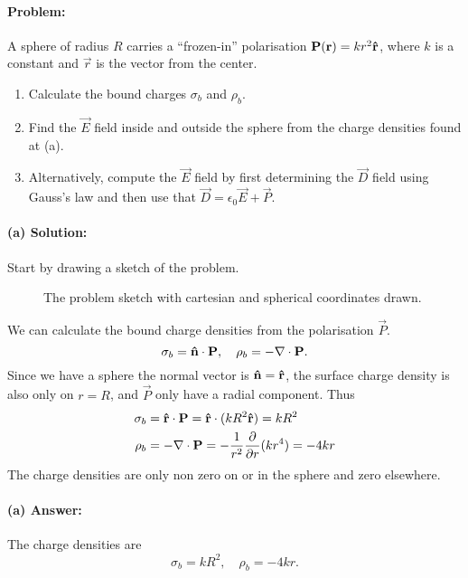 \paragraph{Problem:} A sphere of radius $R$ carries a ``frozen-in'' polarisation $\mathbf{P}(\mathbf{r}) = kr^2 \mathbf{\hat{r}}$, where $k$ is a constant
and $\vec{r}$ is the vector from the center.
\begin{enumerate}[label=(\alph*)]
    \item Calculate the bound charges $\sigma_b$ and $\rho_b$.
    \item Find the $\vec{E}$ field inside and outside the sphere from the charge densities found at (a).
    \item Alternatively, compute the $\vec{E}$ field by first determining the $\vec{D}$ field using Gauss's law and then use that $\vec{D} = \epsilon_0 \vec{E} + \vec{P}$.
\end{enumerate}

\paragraph{(a) Solution:}
Start by drawing a sketch of the problem.
\begin{figure}[H]
    \centering
    
    \caption{The problem sketch with cartesian and spherical coordinates drawn.}\label{fig:sketch}
\end{figure}
We can calculate the bound charge densities from the polarisation $\vec{P}$.
\begin{equation}
    \sigma_b = \mathbf{\hat{n}} \cdot \mathbf{P}, \quad \rho_b = - \nabla \cdot \mathbf{P}.
\end{equation}
Since we have a sphere the normal vector is $\mathbf{\hat{n}} = \mathbf{\hat{r}}$, the surface charge density is also only on $r=R$, and $\vec{P}$ only have a radial component. Thus
\begin{align}
    \sigma_b &= \mathbf{\hat{r}} \cdot \mathbf{P} = \mathbf{\hat{r}} \cdot (kR^2 \mathbf{\hat{r}}) = kR^2\\
    \rho_b &= -\nabla \cdot \mathbf{P} = -\frac{1}{r^2} \frac{\partial}{\partial r} (kr^4) = -4kr
\end{align}
The charge densities are only non zero on or in the sphere and zero elsewhere.

\paragraph{(a) Answer:} The charge densities are
\begin{equation}
    \sigma_b = kR^2, \quad \rho_b = -4kr.
\end{equation}

